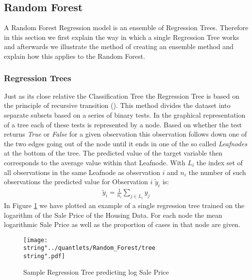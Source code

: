 \subsection{Random Forest}
A Random Forest Regression model is an ensemble of Regression Trees. Therefore in this section we first explain the way in which a single Regression Tree works and afterwards we illustrate the method of creating an ensemble method and explain how this applies to the Random Forest.
\subsubsection{Regression Trees}
Just as its close relative the Classification Tree the Regression Tree is based on the principle of recursive transition (\cite{liaw_classification_2002}). This method divides the dataset into separate subsets based on a series of binary tests. In the graphical representation of a tree each of these tests is represented by a node. Based on whether the test returns \textit{True} or \textit{False} for a given observation this observation follows down one of the two edges going out of the node until it ends in one of the so called \textit{Leafnodes} at the bottom of the tree. The predicted value of the target variable then corresponds to the average value within that Leafnode. With $L_i$ the index set of all observations in the same Leafnode as observation $i$ and $n_i$ the number of such observations the predicted value for Observation $i$ $\tilde{y}_i$ is:
\begin{align}
\tilde{y}_i = \frac{1}{n_i}\sum_{j \in L_i} y_j
\end{align}
In Figure  \ref{fig:tree} we have plotted an example of a single regression tree trained on the logarithm of the Sale Price of the Housing Data. For each node the mean logarithmic Sale Price as well as the proportion of cases in that node are given. 
\begin{figure}
  \centering
\texttt{[image: \\string"../quantlets/Random\_Forest/tree\\string".pdf]}
  \caption{Sample Regression Tree predicting log Sale Price}\label{fig:tree}
\end{figure}

